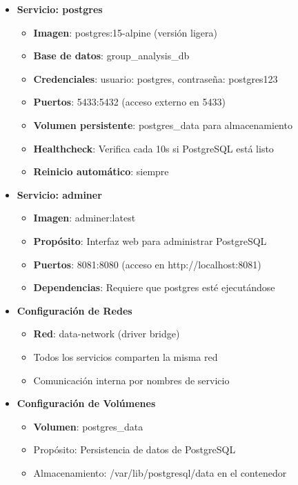 \begin{itemize}
	\item \textbf{Servicio: postgres}
	\begin{itemize}
		\item \textbf{Imagen}: postgres:15-alpine (versión ligera)
		\item \textbf{Base de datos}: group\_analysis\_db
		\item \textbf{Credenciales}: usuario: postgres, contraseña: postgres123
		\item \textbf{Puertos}: 5433:5432 (acceso externo en 5433)
		\item \textbf{Volumen persistente}: postgres\_data para almacenamiento
		\item \textbf{Healthcheck}: Verifica cada 10s si PostgreSQL está listo
		\item \textbf{Reinicio automático}: siempre
	\end{itemize}
	
	\item \textbf{Servicio: adminer}
	\begin{itemize}
		\item \textbf{Imagen}: adminer:latest
		\item \textbf{Propósito}: Interfaz web para administrar PostgreSQL
		\item \textbf{Puertos}: 8081:8080 (acceso en http://localhost:8081)
		\item \textbf{Dependencias}: Requiere que postgres esté ejecutándose
	\end{itemize}
	
	\item \textbf{Configuración de Redes}
	\begin{itemize}
		\item \textbf{Red}: data-network (driver bridge)
		\item Todos los servicios comparten la misma red
		\item Comunicación interna por nombres de servicio
	\end{itemize}
	
	\item \textbf{Configuración de Volúmenes}
	\begin{itemize}
		\item \textbf{Volumen}: postgres\_data
		\item Propósito: Persistencia de datos de PostgreSQL
		\item Almacenamiento: /var/lib/postgresql/data en el contenedor
	\end{itemize}
	

\end{itemize}
